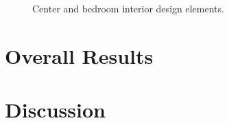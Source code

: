 \documentclass[
oneside,
fontsize=11pt
]{scrartcl}
\begin{document}
\begin{figure}[ht]
\begin{subfigure}[t]{0.3\textwidth}
  \end{subfigure}
  
  \caption{Center and bedroom interior design elements.}
  \label{fig_interior_design_center_bedroom}
\end{figure}


\section{Overall Results}

\section{Discussion}








\newpage
\appendix  %




\end{document}
